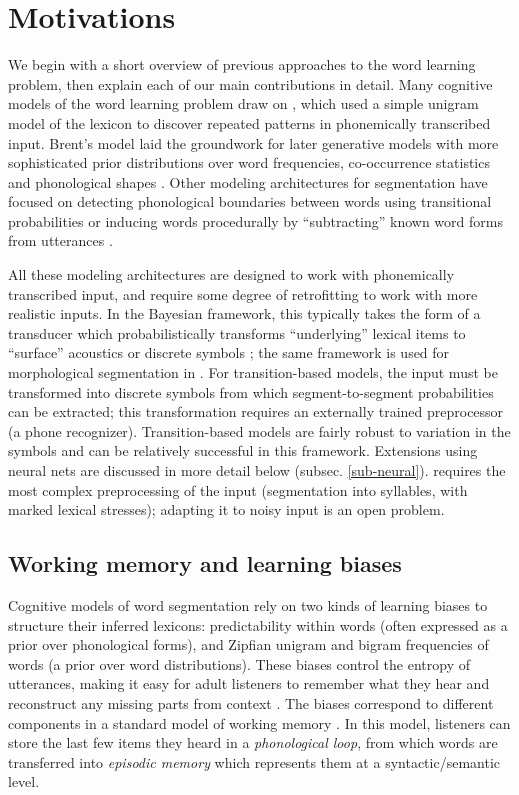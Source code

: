 \documentclass[11pt,letterpaper]{article}
\begin{document}
\section{Motivations}

We begin with a short overview of previous approaches to the word
learning problem, then explain each of our main contributions in
detail. Many cognitive models of the word learning problem draw on
, which used a simple unigram model of the lexicon to
discover repeated patterns in phonemically transcribed input. Brent's
model laid the groundwork for later generative models with more
sophisticated prior distributions over word frequencies, co-occurrence
statistics and phonological shapes \cite[among
  others]{Johnson09}. Other modeling architectures for segmentation
have focused on detecting phonological boundaries between words using
transitional probabilities \cite[among others]{Christiansen98} or
inducing words procedurally by ``subtracting'' known word forms from
utterances \cite{Lignos11}.

All these modeling architectures are designed to work with
phonemically transcribed input, and require some degree of
retrofitting to work with more realistic inputs. In the Bayesian
framework, this typically takes the form of a transducer which
probabilistically transforms ``underlying'' lexical items to
``surface'' acoustics \cite{Lee15} or discrete symbols
\cite{Elsner13}; the same framework is used for morphological
segmentation in . For transition-based models,
the input must be transformed into discrete symbols from which
segment-to-segment probabilities can be extracted; this transformation
requires an externally trained preprocessor (a phone
recognizer). Transition-based models are fairly robust to variation in
the symbols \cite{Rytting07,Rytting08,Daland10,Fleck08} and can be relatively
successful in this framework. Extensions using neural nets
\cite{Christiansen98,Rytting08} are discussed in more detail below
(subsec. \ref{sub-neural}).  requires the most
complex preprocessing of the input (segmentation into syllables, with
marked lexical stresses); adapting it to noisy input is an open
problem.

\subsection{Working memory and learning biases}

Cognitive models of word segmentation rely on two kinds of learning
biases to structure their inferred lexicons: predictability within
words (often expressed as a prior over phonological forms), and
Zipfian unigram and bigram frequencies of words (a prior over word
distributions). These biases control the entropy of utterances, making
it easy for adult listeners to remember what they hear and reconstruct
any missing parts from context \cite{Piantadosi12}. The biases
correspond to different components in a standard model of working
memory \cite{Baddeley07,Baddeley74}. In this model, listeners can
store the last few items they heard in a \textit{phonological loop},
from which words are transferred into \textit{episodic memory} which
represents them at a syntactic/semantic level.
\end{document}
